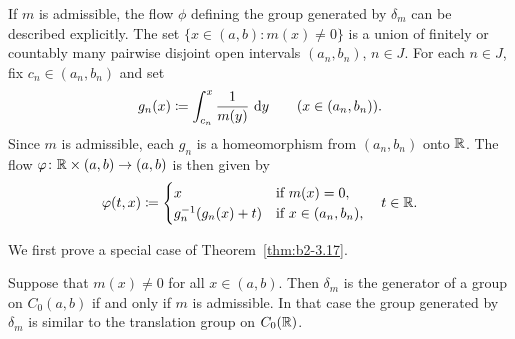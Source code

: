 \begin{remark}\label{rem:b2-3.17}
If\/ $m$ is admissible, the flow $\phi$ defining the group generated by $\delta_{m}$
can be described explicitly.
The set $\{x \in (a,b) \colon m(x) \neq 0\}$ is a union of finitely or countably many
pairwise disjoint open intervals $(a_{n},b_{n})$, $n \in J$.
For each $n \in J$, fix $c_{n} \in (a_{n},b_{n})$ and set
\[
    g_{n}(x) \coloneq \int_{c_{n}}^{x} \frac{1}{m(y)}\,\mathop{}\!\mathrm{d}{y} \qquad (x \in (a_{n},b_{n})).
\]
Since $m$ is admissible, each $g_{n}$ is a homeomorphism from $(a_{n},b_{n})$ onto $\mathbb{R}$.
The flow $\phi \colon \R \times (a,b) \to (a,b)$ is then given by
\begin{equation}\label{eq:b2-3.22}
    \phi(t,x) \coloneq \begin{cases}
        x                       & \text{if } m(x) = 0, \\
        g_{n}^{-1}(g_{n}(x)+t) & \text{if } x \in (a_{n},b_{n}),
    \end{cases}
    \quad t \in \R.
\end{equation}
\end{remark}
We first prove a special case of Theorem~\ref{thm:b2-3.17}.
\begin{proposition}\label{prop:b2-3.18}
%
Suppose that $m(x) \neq 0$ for all $x \in (a,b)$.
Then $\delta_{m}$ is the generator of a group on $C_{0}(a,b)$ if and only if\/ $m$ is admissible.
In that case the group generated by $\delta_{m}$ is similar to the translation group on $C_{0}(\mathbb{R})$.
\end{proposition}
